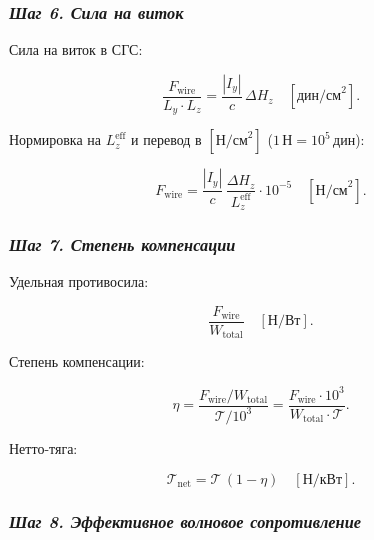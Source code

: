 \documentclass[11pt]{article}
\begin{document}
    \subsubsection{\texorpdfstring{\emph{Шаг 6. Сила на
виток}}{Шаг 6. Сила на виток}}\label{ux448ux430ux433-6.-ux441ux438ux43bux430-ux43dux430-ux432ux438ux442ux43eux43a}

Сила на виток в СГС:

\begin{equation*}
    \frac{F_{\text{wire}}}{L_y \cdot L_z}
    = \frac{|I_y|}{c}\,\Delta H_z
    \quad [\text{дин/см}^2].
\end{equation*}

Нормировка на \(L_z^{\text{eff}}\) и перевод в \([\text{Н/см}^2]\)
(\(1\,\text{Н} = 10^5\,\text{дин}\)):

\begin{equation}
    \boxed{
        F_{\text{wire}}
        = \frac{|I_y|}{c}\,\frac{\Delta H_z}{L_z^{\text{eff}}} \cdot 10^{-5}
        \quad [\text{Н/см}^2].
    }
    \label{eq:F_wire_units}
\end{equation}

\subsubsection{\texorpdfstring{\emph{Шаг 7. Степень
компенсации}}{Шаг 7. Степень компенсации}}\label{ux448ux430ux433-7.-ux441ux442ux435ux43fux435ux43dux44c-ux43aux43eux43cux43fux435ux43dux441ux430ux446ux438ux438}

Удельная противосила:

\begin{equation*}
    \frac{F_{\text{wire}}}{W_{\text{total}}}
    \quad [\text{Н/Вт}].
\end{equation*}

Степень компенсации:

\begin{equation}
    \boxed{
        \eta = \frac{F_{\text{wire}} / W_{\text{total}}}{\mathcal{T} / 10^3}
             = \frac{F_{\text{wire}} \cdot 10^3}{W_{\text{total}} \cdot \mathcal{T}}.
    }
    \label{eq:eta_units}
\end{equation}

Нетто-тяга:

\begin{equation*}
    \mathcal{T}_{\text{net}} = \mathcal{T}\,(1 - \eta)
    \quad [\text{Н/кВт}].
\end{equation*}

\subsubsection{\texorpdfstring{\emph{Шаг 8. Эффективное волновое
сопротивление}}{Шаг 8. Эффективное волновое сопротивление}}\label{ux448ux430ux433-8.-ux44dux444ux444ux435ux43aux442ux438ux432ux43dux43eux435-ux432ux43eux43bux43dux43eux432ux43eux435-ux441ux43eux43fux440ux43eux442ux438ux432ux43bux435ux43dux438ux435}
\end{document}
